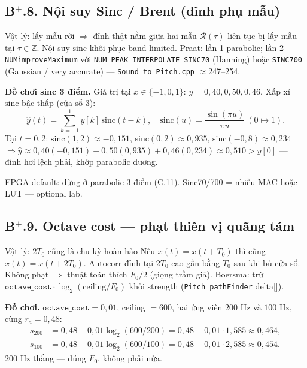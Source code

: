 \subsection*{B$^+$.8. Nội suy Sinc / Brent (đỉnh phụ mẫu)}

\begin{firstprin}{Vật lý: lấy mẫu rời $\Rightarrow$ đỉnh thật nằm giữa hai mẫu}
$\mathcal{R}(\tau)$ liên tục bị lấy mẫu tại $\tau\in\mathbb{Z}$. Nội suy $\mathrm{sinc}$ khôi phục band-limited. Praat: lần 1 parabolic; lần 2 \texttt{NUMimproveMaximum} với \texttt{NUM\_PEAK\_INTERPOLATE\_SINC70} (Hanning) hoặc \texttt{SINC700} (Gaussian / very accurate) --- \texttt{Sound\_to\_Pitch.cpp} $\approx$247--254.
\end{firstprin}

\noindent\textbf{Đồ chơi sinc 3 điểm.} Giá trị tại $x\in\{-1,0,1\}$: $y=0{,}40,0{,}50,0{,}46$.
Xấp xỉ $\mathrm{sinc}$ bậc thấp (cửa sổ 3):
\[
\hat y(t)=\sum_{k=-1}^{1} y[k]\,\mathrm{sinc}(t-k),\quad \mathrm{sinc}(u)=\frac{\sin(\pi u)}{\pi u}\ (0\mapsto1).
\]
Tại $t=0{,}2$: $\mathrm{sinc}(1{,}2)\approx-0{,}151$, $\mathrm{sinc}(0{,}2)\approx0{,}935$, $\mathrm{sinc}(-0{,}8)\approx0{,}234$
$\Rightarrow \hat y\approx0{,}40(-0{,}151)+0{,}50(0{,}935)+0{,}46(0{,}234)\approx0{,}510 > y[0]$ --- đỉnh hơi lệch phải, khớp parabolic dương.

\begin{costbox}
FPGA default: dừng ở parabolic 3 điểm (C.11). Sinc70/700 = nhiều MAC hoặc LUT --- optional lab.
\end{costbox}

\subsection*{B$^+$.9. Octave cost --- phạt thiên vị quãng tám}

\begin{firstprin}{Vật lý: $2T_0$ cũng là chu kỳ hoàn hảo}
Nếu $x(t)=x(t+T_0)$ thì cũng $x(t)=x(t+2T_0)$. Autocorr đỉnh tại $2T_0$ cao gần bằng $T_0$ sau khi bù cửa sổ. Không phạt $\Rightarrow$ thuật toán thích $F_0/2$ (giọng trầm giả). Boersma: trừ $\texttt{octave\_cost}\cdot\log_2(\mathrm{ceiling}/F_0)$ khỏi strength (\texttt{Pitch\_pathFinder} delta[]).
\end{firstprin}

\noindent\textbf{Đồ chơi.} $\texttt{octave\_cost}=0{,}01$, ceiling $=600$, hai ứng viên $200\text{ Hz}$ và $100\text{ Hz}$, cùng $r_a=0{,}48$:
\begin{align*}
s_{200}&=0{,}48-0{,}01\log_2(600/200)=0{,}48-0{,}01\cdot1{,}585\approx0{,}464,\\
s_{100}&=0{,}48-0{,}01\log_2(600/100)=0{,}48-0{,}01\cdot2{,}585\approx0{,}454.
\end{align*}
$200\text{ Hz}$ thắng --- đúng $F_0$, không phải nửa.

